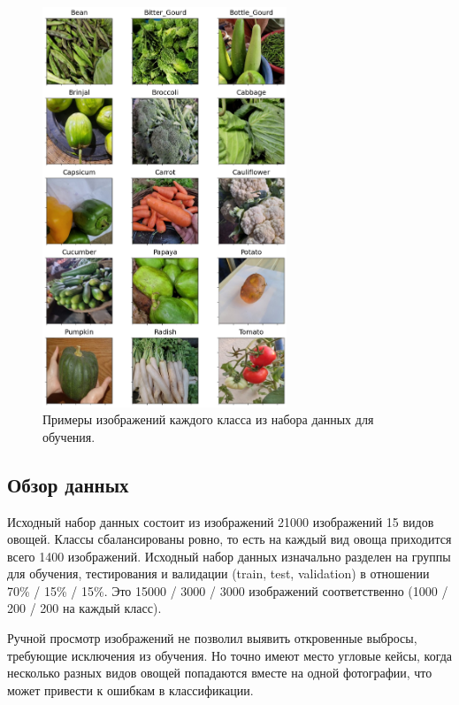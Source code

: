 \documentclass[a4paper,12pt]{extarticle}
\begin{document}
\begin{figure}[ht]
	\centering
	\includegraphics[width=0.65\textwidth]{EDA.png}
	\caption{Примеры изображений каждого класса из набора данных для обучения.}
	\label{fig:EDA}
\end{figure}

\newpage
\subsection{Обзор данных}

Исходный набор данных состоит из изображений 21000 изображений 15 видов овощей. Классы
сбалансированы ровно, то есть на каждый вид овоща приходится всего 1400 изображений. Исходный набор
данных изначально разделен на группы для обучения, тестирования и валидации (train, test, validation)
в отношении 70\% / 15\% / 15\%. Это 15000 / 3000 / 3000 изображений соответственно (1000 / 200 / 200
на каждый класс).\par

Ручной просмотр изображений не позволил выявить откровенные выбросы, требующие исключения из
обучения. Но точно имеют место угловые кейсы, когда несколько разных видов овощей попадаются вместе
на одной фотографии, что может привести к ошибкам в классификации.
\end{document}
